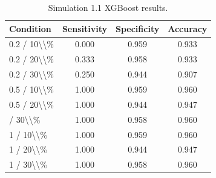 \begin{table}[!h]
\centering
\caption{\label{tab:tab:sim11_xgb}Simulation 1.1 XGBoost results.}
\centering
\begin{tabular}[t]{lccc}
\toprule
Condition & Sensitivity & Specificity & Accuracy\\
\midrule
0.2 / 10\textbackslash{}\textbackslash{}\% & 0.000 & 0.959 & 0.933\\
0.2 / 20\textbackslash{}\textbackslash{}\% & 0.333 & 0.958 & 0.933\\
0.2 / 30\textbackslash{}\textbackslash{}\% & 0.250 & 0.944 & 0.907\\
0.5 / 10\textbackslash{}\textbackslash{}\% & 1.000 & 0.959 & 0.960\\
0.5 / 20\textbackslash{}\textbackslash{}\% & 1.000 & 0.944 & 0.947\\
\addlinespace
0.5 / 30\textbackslash{}\textbackslash{}\% & 1.000 & 0.958 & 0.960\\
1 / 10\textbackslash{}\textbackslash{}\% & 1.000 & 0.959 & 0.960\\
1 / 20\textbackslash{}\textbackslash{}\% & 1.000 & 0.944 & 0.947\\
1 / 30\textbackslash{}\textbackslash{}\% & 1.000 & 0.958 & 0.960\\
\bottomrule
\end{tabular}
\end{table}

